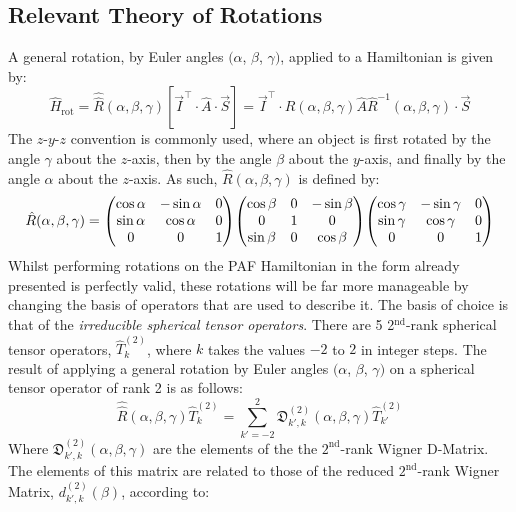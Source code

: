 \subsection{Relevant Theory of Rotations}
A general rotation, by Euler angles $(\alpha$, $\beta$, $\gamma)$, applied to a Hamiltonian is given by:
\begin{equation}
\hat{H}_{\text{rot}} = \hat{\hat{R}}(\alpha, \beta, \gamma)[\vec{I}^{\intercal}\cdot\hat{A}\cdot\vec{S}] = \vec{I}^{\intercal} \cdot \hat{R}(\alpha, \beta, \gamma) \hat{A} \hat{R}^{-1}(\alpha, \beta, \gamma) \cdot \vec{S}
\end{equation}
The $z$-$y$-$z$ convention is commonly used, where an object is first rotated by the angle $\gamma$ about the $z$-axis, then by the angle $\beta$ about the $y$-axis, and finally by the angle $\alpha$ about the $z$-axis. As such, $\hat{R}(\alpha, \beta, \gamma)$ is defined by:
\begin{equation}
\hat{R}(\alpha, \beta, \gamma) = \mqty(\cos \alpha & -\sin \alpha & 0 \\ \sin \alpha & \cos \alpha & 0 \\ 0 & 0 & 1) \mqty(\cos \beta & 0 & -\sin \beta \\ 0 & 1 & 0 \\ \sin \beta & 0 & \cos \beta) \mqty(\cos \gamma & -\sin \gamma & 0 \\ \sin \gamma & \cos \gamma & 0 \\ 0 & 0 & 1)
\end{equation}
Whilst performing rotations on the PAF Hamiltonian in the form already presented is perfectly valid, these rotations will be far more manageable by changing the basis of operators that are used to describe it. The basis of choice is that of the \textit{irreducible spherical tensor operators}. There are 5 2$^{\text{nd}}$-rank spherical tensor operators, $\hat{T}_k^{(2)}$, where $k$ takes the values $-2$ to $2$ in integer steps. 
The result of applying a general rotation by Euler angles $(\alpha$, $\beta$, $\gamma)$ on a spherical tensor operator of rank 2 is as follows:
\begin{equation}
\hat{\hat{R}}(\alpha, \beta, \gamma) \hat{T}_{k}^{(2)} = \sum \limits_{k{\prime} = -2}^2 \mathfrak{D}_{k{\prime},k}^{(2)}(\alpha, \beta, \gamma) \hat{T}_{k{\prime}}^{(2)}
\end{equation}
Where $\mathfrak{D}_{k{\prime},k}^{(2)}(\alpha, \beta, \gamma)$ are the elements of the the $\text{2}^{\text{nd}}$-rank Wigner D-Matrix. The elements of this matrix are related to those of the reduced $\text{2}^{\text{nd}}$-rank Wigner Matrix, $d_{k{\prime},k}^{(2)}(\beta)$, according to:
